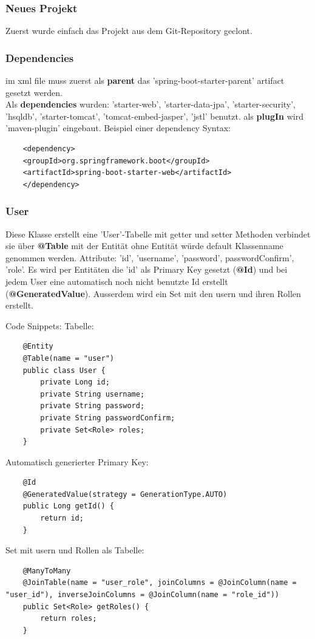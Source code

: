 \subsubsection{Neues Projekt}
Zuerst wurde einfach das Projekt aus dem Git-Repository geclont.
 
\subsubsection{Dependencies}
im xml file muss zuerst als \textbf{parent} das 'spring-boot-starter-parent' artifact gesetzt werden.
\\Als \textbf{dependencies} wurden: 'starter-web', 'starter-data-jpa', 'starter-security', 'hsqldb', 'starter-tomcat', 'tomcat-embed-jasper', 'jstl' benutzt. als \textbf{plugIn} wird 'maven-plugin' eingebaut.
Beispiel einer dependency Syntax:
\begin{lstlisting}
	<dependency>
	<groupId>org.springframework.boot</groupId>
	<artifactId>spring-boot-starter-web</artifactId>
	</dependency>
\end{lstlisting}

\subsubsection{User}
Diese Klasse erstellt eine 'User'-Tabelle mit getter und setter Methoden verbindet sie über \textbf{@Table} mit der Entität ohne Entität würde default Klassenname genommen werden. Attribute: 'id', 'username', 'password', passwordConfirm', 'role'. Es wird per Entitäten die 'id' als Primary Key gesetzt (\textbf{@Id}) und bei jedem User eine automatisch noch nicht benutzte Id erstellt (\textbf{@GeneratedValue}). Ausserdem wird ein Set mit den usern und ihren Rollen erstellt.

Code Snippets:
Tabelle:
\begin{lstlisting}
	@Entity
	@Table(name = "user")
	public class User {
		private Long id;
		private String username;
		private String password;
		private String passwordConfirm;
		private Set<Role> roles;
	}
\end{lstlisting}
Automatisch generierter Primary Key:
\begin{lstlisting}	
	@Id
	@GeneratedValue(strategy = GenerationType.AUTO)
	public Long getId() {
		return id;
	}
\end{lstlisting}
Set mit usern und Rollen als Tabelle:
\begin{lstlisting}	
	@ManyToMany
	@JoinTable(name = "user_role", joinColumns = @JoinColumn(name = "user_id"), inverseJoinColumns = @JoinColumn(name = "role_id"))
	public Set<Role> getRoles() {
		return roles;
	}
\end{lstlisting}

